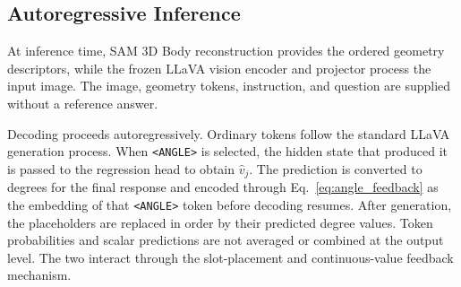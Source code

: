 \subsection{Autoregressive Inference}
\label{sec:inference}

At inference time, SAM 3D Body reconstruction provides the ordered geometry descriptors, while the frozen LLaVA vision encoder and projector process the input image.
The image, geometry tokens, instruction, and question are supplied without a reference answer.

Decoding proceeds autoregressively.
Ordinary tokens follow the standard LLaVA generation process.
When \texttt{<ANGLE>} is selected, the hidden state that produced it is passed to the regression head to obtain $\widehat{v}_j$.
The prediction is converted to degrees for the final response and encoded through Eq.~\eqref{eq:angle_feedback} as the embedding of that \texttt{<ANGLE>} token before decoding resumes.
After generation, the placeholders are replaced in order by their predicted degree values.
Token probabilities and scalar predictions are not averaged or combined at the output level.
The two interact through the slot-placement and continuous-value feedback mechanism.
